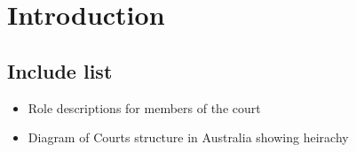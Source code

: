 \chapter{Introduction \label{chap:Introduction}}
\section{Include list}
\begin{itemize}
\item Role descriptions for members of the court
\item Diagram of Courts structure in Australia showing heirachy
\end{itemize}




